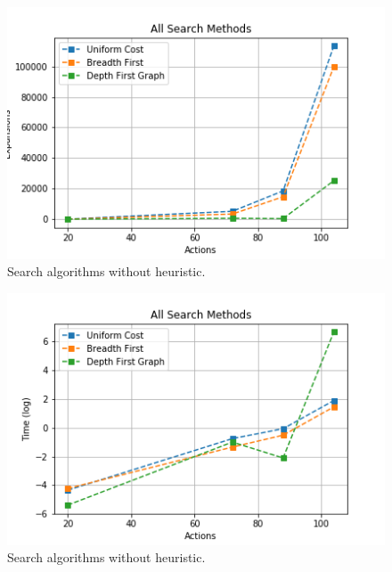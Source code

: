 \documentclass[a4paper]{article}
\begin{document}
\begin{figure}[htpb]
\begin{center}
\includegraphics[width=1\columnwidth]{fig/results_sm234.png}
\caption{Search algorithms without heuristic.}
\end{center}
\label{figsm234}
\end{figure}
    


\begin{figure}[htpb]
\begin{center}
\includegraphics[width=1\columnwidth]{fig/results_sm231.png}
\caption{Search algorithms without heuristic.}
\end{center}
\label{figsm231}
\end{figure}

\end{document}
